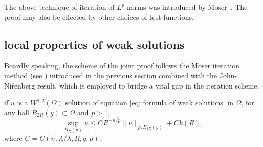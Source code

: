 The above technique of iteration of $L^p$ norms was introduced by Moser~\cite{Moser1960}.
The proof may also be effected by other choices of test functions.

\subsection{local properties of weak solutions}

Boardly speaking, the scheme of the joint proof follows the Moser iteration method (see \cite{Moser1961}) introduced in the previous section combined with the John-Nirenberg result, which is employed to bridge a vital gap in the iteration scheme.

\begin{lemma}
	if $u$ is a $W^{1,2}(\Omega)$ solution of equation \eqref{eq: formula of weak solutions} in $\Omega$,
	for any ball $B_{2R}(y)\subset\Omega$ and $p>1$,
	\[
		\sup_{B_R(y)} u \leq CR^{-n/p}\|u\|_{p, B_{2R}(y)} + Ck(R),
	\]
	where $C=C(n, \Lambda/\lambda, R, q, p)$.
\end{lemma}
